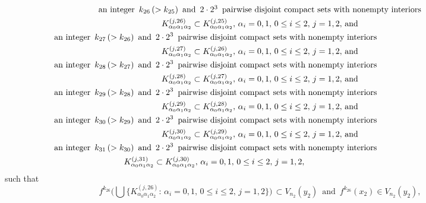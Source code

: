 \documentclass[12pt]{article}
\newcommand{\al}{\alpha}
\begin{document}
\begin{multline*}
$$
\text{an integer} \,\,\, k_{26} \, (> k_{25}) \,\,\, \text{and} \,\,\, 2 \cdot 2^3 \,\,\, \text{pairwise disjoint compact sets with nonempty interiors} \\      K_{\al_0\al_1\al_2}^{(j,26)} \subset K_{\al_0\al_1\al_2}^{(j,25)}, \, \al_i = 0, 1, \, 0 \le i \le 2, \, j = 1, 2, \, \text{and} \\
\,\,\,\,\, \text{an integer} \,\,\, k_{27} \, (> k_{26}) \,\,\, \text{and} \,\,\, 2 \cdot 2^3 \,\,\, \text{pairwise disjoint compact sets with nonempty interiors}\qquad\qquad\qquad\qquad\qquad\quad\,\,\, \\ 
K_{\al_0\al_1\al_2}^{(j,27)} \subset K_{\al_0\al_1\al_2}^{(j,26)}, \, \al_i = 0, 1, \, 0 \le i \le 2, \, j = 1, 2, \, \text{and}  \\
\,\,\,\,\, \text{an integer} \,\,\, k_{28} \, (> k_{27}) \,\,\, \text{and} \,\,\, 2 \cdot 2^3 \,\,\, \text{pairwise disjoint compact sets with nonempty interiors}\qquad\qquad\qquad\qquad\qquad\quad\,\,\, \\      
K_{\al_0\al_1\al_2}^{(j,28)} \subset K_{\al_0\al_1\al_2}^{(j,27)}, \, \al_i = 0, 1, \, 0 \le i \le 2, \, j = 1, 2, \, \text{and} \\
\,\,\,\,\, \text{an integer} \,\,\, k_{29} \, (> k_{28}) \,\,\, \text{and} \,\,\, 2 \cdot 2^3 \,\,\, \text{pairwise disjoint compact sets with nonempty interiors}\qquad\qquad\qquad\qquad\qquad\quad\,\,\, \\ 
K_{\al_0\al_1\al_2}^{(j,29)} \subset K_{\al_0\al_1\al_2}^{(j,28)}, \, \al_i = 0, 1, \, 0 \le i \le 2, \, j = 1, 2, \, \text{and}  \\
\,\,\,\,\, \text{an integer} \,\,\, k_{30} \, (> k_{29}) \,\,\, \text{and} \,\,\, 2 \cdot 2^3 \,\,\, \text{pairwise disjoint compact sets with nonempty interiors}\qquad\qquad\qquad\qquad\qquad\quad\,\,\, \\ 
K_{\al_0\al_1\al_2}^{(j,30)} \subset K_{\al_0\al_1\al_2}^{(j,29)}, \, \al_i = 0, 1, \, 0 \le i \le 2, \, j = 1, 2, \, \text{and}  \\
\,\,\,\,\, \text{an integer} \,\,\, k_{31} \, (> k_{30}) \,\,\, \text{and} \,\,\, 2 \cdot 2^3 \,\,\, \text{pairwise disjoint compact sets with nonempty interiors}\qquad\qquad\qquad\qquad\qquad\quad\,\,\, \\ 
K_{\al_0\al_1\al_2}^{(j,31)} \subset K_{\al_0\al_1\al_2}^{(j,30)}, \, \al_i = 0, 1, \, 0 \le i \le 2, \, j = 1, 2, \qquad\qquad\qquad\qquad\qquad\quad
$$
\end{multline*}
such that
$$
f^{k_{26}}\bigg(\bigcup \big\{ K_{\al_0\al_1\al_2}^{(j,26)}: \, \al_i = 0, 1, \, 0 \le i \le 2, \, j = 1, 2 \big\}\bigg) \, \subset V_{n_2}(y_2) \,\,\, \text{and} \,\,\, f^{k_{26}}(x_2) \in V_{n_2}(y_2),  
$$
\end{document}

